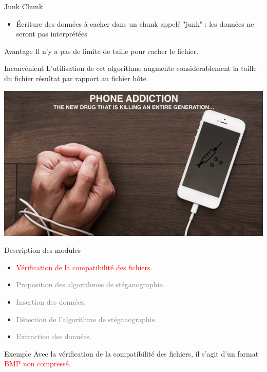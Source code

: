 \documentclass{beamer}
\begin{document}
    \begin{frame}
    
	\begin{block}{Junk Chunk}
	\begin{itemize}
	[circle]
	\item Écriture des données à cacher dans un chunk appelé "junk" : les 
	données ne seront pas interprétées  
	\end{itemize}
	\end{block}
	
	\begin{exampleblock}{Avantage} 
	Il n'y a pas de limite de taille pour cacher le fichier. 
	\end{exampleblock}
	
	\begin{alertblock}{Inconvénient} 
	L'utilisation de cet algorithme augmente considérablement la taille du 
	fichier résultat par rapport au fichier hôte. 
	\end{alertblock}
	
	\hspace{4.4cm}
    \includegraphics[scale=0.08]{ANGS3/addiction.png}
    
    \end{frame}

    \begin{frame} %
	\begin{block}{Description des modules}
	\begin{itemize}
	[circle]
	\item \textcolor{red}{Vérification de la compatibilité des fichiers.}
	\item \textcolor{gray} {Proposition des algorithmes de stéganographie.}
	\item \textcolor{gray} {Insertion des données.}
	\item \textcolor{gray} {Détection de l'algorithme de stéganographie.}
	\item \textcolor{gray} {Extraction des données.}
	\end{itemize}
	\end{block}
	
	\begin{exampleblock}{Exemple} 
	Avec la vérification de la compatibilité des fichiers, il s'agit d'un 
	format \textcolor{red}{BMP non compressé}.  
	\end{exampleblock}
  \end{frame}
  
\end{document}
